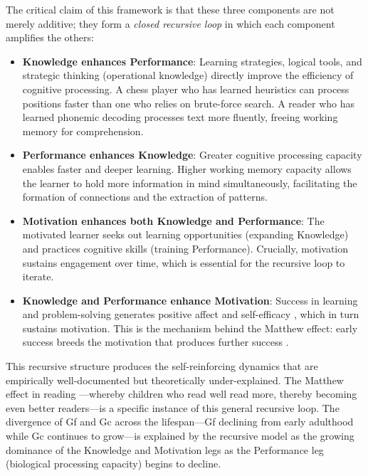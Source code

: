 \documentclass[12pt,a4paper]{article}
\begin{document}
The critical claim of this framework is that these three components are not merely additive; they form a \emph{closed recursive loop} in which each component amplifies the others:

\begin{itemize}
\item \textbf{Knowledge enhances Performance}: Learning strategies, logical tools, and strategic thinking (operational knowledge) directly improve the efficiency of cognitive processing. A chess player who has learned heuristics can process positions faster than one who relies on brute-force search. A reader who has learned phonemic decoding processes text more fluently, freeing working memory for comprehension.

\item \textbf{Performance enhances Knowledge}: Greater cognitive processing capacity enables faster and deeper learning. Higher working memory capacity allows the learner to hold more information in mind simultaneously, facilitating the formation of connections and the extraction of patterns.

\item \textbf{Motivation enhances both Knowledge and Performance}: The motivated learner seeks out learning opportunities (expanding Knowledge) and practices cognitive skills (training Performance). Crucially, motivation sustains engagement over time, which is essential for the recursive loop to iterate.

\item \textbf{Knowledge and Performance enhance Motivation}: Success in learning and problem-solving generates positive affect and self-efficacy \citep{Bandura1997}, which in turn sustains motivation. This is the mechanism behind the Matthew effect: early success breeds the motivation that produces further success \citep{Stanovich1986}.
\end{itemize}

This recursive structure produces the self-reinforcing dynamics that are empirically well-documented but theoretically under-explained. The Matthew effect in reading \citep{Stanovich1986}---\hspace{0pt}whereby children who read well read more, thereby becoming even better readers---\hspace{0pt}is a specific instance of this general recursive loop. The divergence of Gf and Gc across the lifespan---\hspace{0pt}Gf declining from early adulthood while Gc continues to grow---\hspace{0pt}is explained by the recursive model as the growing dominance of the Knowledge and Motivation legs as the Performance leg (biological processing capacity) begins to decline.
\end{document}
